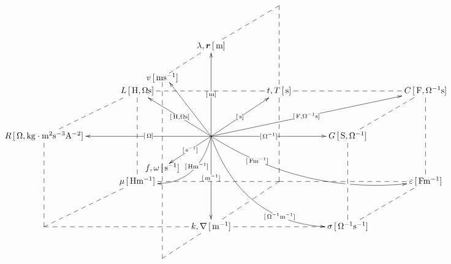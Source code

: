 \documentclass[a4j,10pt]{jarticle}
\makeatletter
\def\uni#1{[\unit{#1}]}
\def\cell#1#2{#1\,\uni{#2}}
\def\dotted#1{\ar@{--}[#1]}
\def\r{\bm r}
\makeatother
\begin{document}
\vspace{-10mm}
\def\tom{\ar[uu]|-{\uni{m}}}
\def\tos{\ar[ur]|-{\uni{s}}}
\def\toO{\ar[ll]|-{\uni{O}}}
\def\tomm{\ar[dd]|-{\uni{m^{-1}}}}
\def\toms{\ar@{->}+(-20,-13)*{\cell{f,\omega}{s^{-1}}}|-{\uni{s^{-1}}}}
\def\tomO{\ar[rr]|-{\uni{O^{-1}}}}
\def\arrr{\dotted{rr}}
\def\ardd{\dotted{dd}}
\def\aruu{\dotted{uu}}
\def\arll{\dotted{ll}}
\def\arllsplit{\dotted{ll}|!{[ld];[lu]}\hole}
\def\arrrsplit{\dotted{rr}|!{[rd];[ru]}\hole}
\def\ard{\dotted{d}}
\def\arur{\dotted{ur}}
\def\ardr{\dotted{dr}}
\def\ardl{\dotted{dl}}
\def\arrowzp{\ar@/^2pc/[dl]|-(0.4){\uni{Hm^{-1}}}}
\def\arrowzzp{\ar@/_2pc/[rrrd]|-(0.25){\uni{Fm^{-1}}}|!{[rr];[rrdd]}\hole }
\def\tolv{\ar@{--}'+(-20,-13)*{\cell{v}{ms^{-1}}}'[dd]+(-20,-13)}
\def\tov{\ar@{->}[uu]+(-20,-13)+(3,-2)}
\def\toL{\ar@{->}[ul]|-{\uni{H,Os}}}
\def\toC{\ar@{->}[urrr]|-{\uni{F,O^{-1}s}}}
\def\arrowyyp{\ar@/_3pc/@{->}[rrdd]|-(0.7){\uni{O^{-1}m^{-1}}}}
\def\tof{\ar@{--}'+(-20,-13)'[uu]+(-20,-13)}
\def\toT{\ar@{--}'[ur]'[dr]}
\[\xymatrix@=0.50in{
  &&*=0{}&*=0{}&*=0{}&\\
      &      & \cell{\lambda,\r}{m} \tolv \toT &      &      &      & \\
      &      \cell{L}{H,Os} \arrrsplit\ardd      &      & \cell{t,T}{s}\arrr      &      & \cell{C}{F,O^{-1}s} \ardd      &      \\
 \cell{R}{O,kg\cdot m^2 s^{-3} A^{-2}}\ardd\arur      &      & *=0{}\arrowyyp\toL\toC\tov\tom\tos\toO\tomO\tomm\toms \arrowzzp \arrowzp      &      & \cell{G}{S,\Omega^{-1}}\arur\ardd      &      & \\
      &      \cell{\mu}{Hm^{-1}}      &      & *=0{} \aruu\ardl\arll      &      & \cell{\varepsilon}{Fm^{-1}} \arllsplit      &      \\
 *=0{} \arur      &      & \cell{k,\nabla}{m^{-1}} \arll\tof      &      & \cell{\sigma}{O^{-1}s^{-1}}\arll\arur      &      & \\
 }\]
\end{document}
